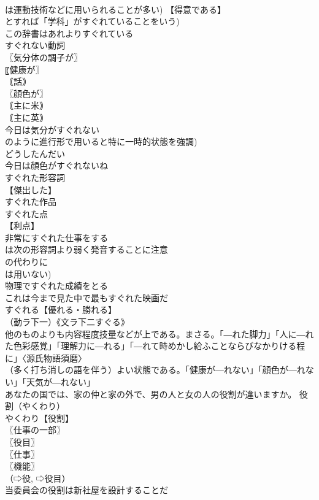 \documentclass[8pt]{extreport}
\begin{document}
\begin{CJK}{UTF8}{min}
\\	は運動技術などに用いられることが多い) 【得意である】
\\	とすれば「学科」がすぐれていることをいう)
\\	この辞書はあれよりすぐれている
\\	すぐれない動詞
\\	〖気分体の調子が〗
\\	〖健康が〗
\\	｟話｠ 
\\	〖顔色が〗
\\	｟主に米｠ 
\\	｟主に英｠ 
\\	今日は気分がすぐれない
\\	のように進行形で用いると特に一時的状態を強調)
\\	どうしたんだい
\\	今日は顔色がすぐれないね
\\	すぐれた形容詞
\\	【傑出した】
\\	すぐれた作品
\\	すぐれた点
\\	【利点】
\\	非常にすぐれた仕事をする
\\	は次の形容詞より弱く発音することに注意
\\	の代わりに 
\\	は用いない)
\\	物理ですぐれた成績をとる
\\	これは今まで見た中で最もすぐれた映画だ
\\	すぐれる【優れる・勝れる】
\\	（動ラ下一）《文ラ下二すぐる》
\\	他のものよりも内容程度技量などが上である。まさる。「―れた脚力」「人に―れた色彩感覚」「理解力に―れる」「―れて時めかし給ふことならびなかりける程に」〈源氏物語須磨〉
\\	（多く打ち消しの語を伴う）よい状態である。「健康が―れない」「顔色が―れない」「天気が―れない」
\\	あなたの国では、家の仲と家の外で、男の人と女の人の役割が違いますか。		役割（やくわり）
\\	やくわり【役割】
\\	〖仕事の一部〗
\\	〖役目〗
\\	〖仕事〗
\\	〖機能〗
\\	（⇨役, ⇨役目）
\\	当委員会の役割は新社屋を設計することだ

\end{CJK}
\end{document}
